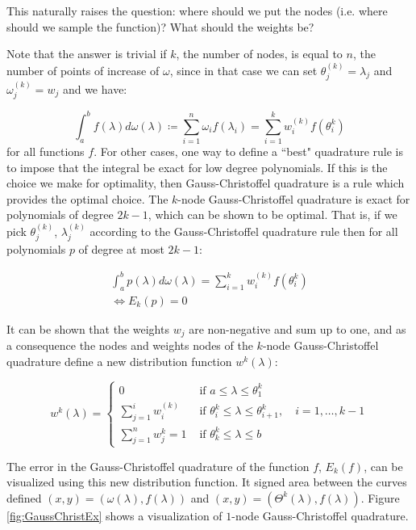 \documentclass[10pt,a4paper]{article}
\begin{document}
This naturally raises the question: where should we put the nodes (i.e. where should we sample the function)? What should the weights be?

Note that the answer is trivial if $k$, the number of nodes, is equal to $n$, the number of points of increase of $\omega$, since in that case we can set $\theta_j^{(k)}  = \lambda_j $ and $\omega_j^{(k)} = w_j$ and we have:

\begin{equation}
\int_a^b f(\lambda) d\omega(\lambda) \coloneqq \sum_{i=1}^n \omega_i f \left( \lambda_i \right) = \sum_{i=1}^{k} w_i^{(k)} f(\theta_i^k)
\end{equation}
for all functions $f$.
For other cases, one way to define a ``best" quadrature rule is to impose that the integral be exact for low degree polynomials. If this is the choice we make for optimality, then Gauss-Christoffel quadrature is a rule which provides the optimal choice. The $k$-node Gauss-Christoffel quadrature is exact for polynomials of degree $2k-1$, which can be shown to be optimal. That is, if we pick $\theta_j^{(k)}$, $\lambda_j^{(k)}$ according to the Gauss-Christoffel quadrature rule then for all polynomials $p$ of degree at most $2k-1$:

\begin{align}
\int_a^b p(\lambda) d\omega(\lambda) = \sum_{i=1}^{k} w_i^{(k)} f(\theta_i^k) \\
\iff E_k(p) =0
\end{align}

It can be shown that the weights $w_j$ are non-negative and sum up to one, and as a consequence the nodes and weights nodes of the $k$-node Gauss-Christoffel quadrature define a new distribution function $w^k(\lambda)$:

\begin{equation} 
w^k(\lambda) = \begin{cases}
0 & \text{ if } a \leq \lambda \leq  \theta_1^k   \\
\sum_{j=1}^i w_i^{(k)}& \text{ if }\theta_i^k\leq \lambda \leq \theta_{i+1}^k,   \quad i = 1,\dots,k-1   \\
\sum_{j=1}^n w_j^k = 1 & \text{ if } \theta_k^k \leq \lambda \leq b     
\end{cases}
\end{equation} 

The error in the Gauss-Christoffel quadrature of the function $f$, $E_k(f)$, can be visualized using this new distribution function. It signed area between the curves defined  $(x,y) = \left( \omega(\lambda), f(\lambda) \right)$ and $(x,y) = \left( \Theta^k(\lambda), f(\lambda) \right)$. Figure \ref{fig:GaussChristEx} shows a visualization of $1$-node Gauss-Christoffel quadrature.
\end{document}
